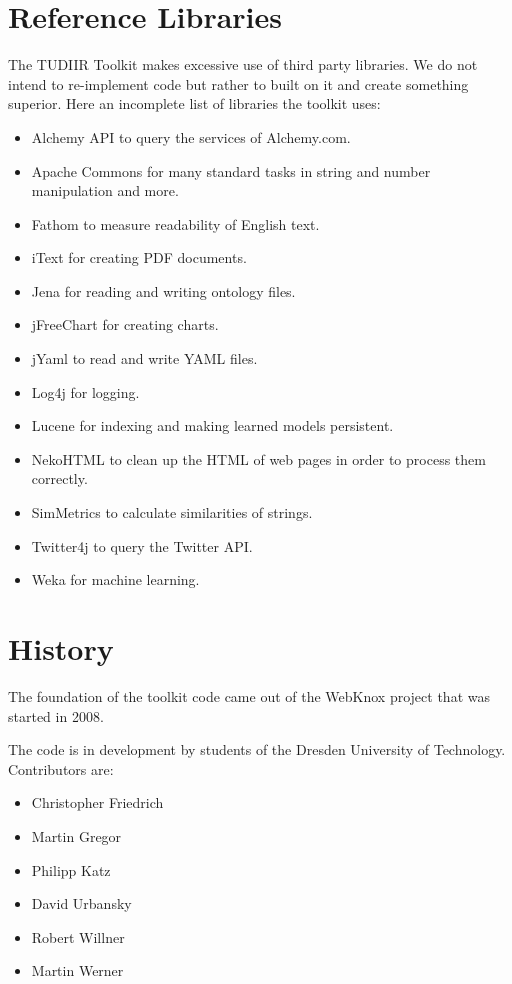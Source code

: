 \documentclass[a4paper,twoside]{article}      %
\begin{document}
\section{Reference Libraries}
The TUDIIR Toolkit makes excessive use of third party libraries. We do not intend to re-implement code but rather to built on it and create something superior. Here an incomplete list of libraries the toolkit uses:
\begin{itemize}
\item Alchemy API \cite{alchemy} to query the services of Alchemy.com.
\item Apache Commons \cite{apachecommons} for many standard tasks in string and number manipulation and more.
\item Fathom \cite{fathom} to measure readability of English text.
\item iText \cite{itext} for creating PDF documents.
\item Jena \cite{jena} for reading and writing ontology files.
\item jFreeChart \cite{jfreechart} for creating charts.
\item jYaml \cite{jyaml} to read and write YAML files.
\item Log4j \cite{log4j} for logging.
\item Lucene \cite{lucene} for indexing and making learned models persistent.
\item NekoHTML \cite{nekohtml} to clean up the HTML of web pages in order to process them correctly.
\item SimMetrics \cite{simmetrics} to calculate similarities of strings.
\item Twitter4j \cite{twitter4j} to query the Twitter API.
\item Weka \cite{weka} for machine learning.
\end{itemize}

\section{History}
The foundation of the toolkit code came out of the WebKnox project\cite{webknox} that was started in 2008.%

The code is in development by students of the Dresden University of Technology. Contributors are:
\begin{itemize}
\item Christopher Friedrich
\item Martin Gregor
\item Philipp Katz
\item David Urbansky
\item Robert Willner
\item Martin Werner
\end{itemize}
\end{document}
